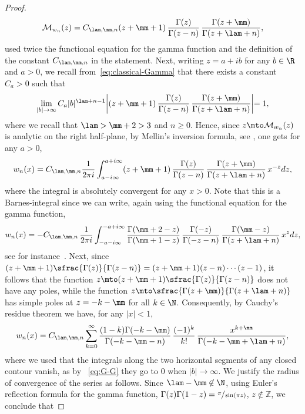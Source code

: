 \begin{proof}
\begin{equation*}
\mathcal{M}_{w_n}(z) = C_{\lam, \mm, n} (z+\mm+1)\,\frac{\Gamma(z)}{\Gamma(z-n)}\, \frac{\Gamma(z+\mm)}{\Gamma(z+\lam+n)},
\end{equation*}
used twice the functional equation for the gamma function and the definition of the constant $C_{\lam, \mm, n}$ in the statement. Next, writing $z=a+ib$ for any $b \in \R$ and $a>0$, we recall from~\eqref{eq:classical-Gamma} that there exists a constant $C_a > 0$ such that
\begin{equation}
\label{eq:G-G}
\lim_{|b| \to \infty} C_a |b|^{\lam + n-1} \biggl|(z+\mm+1)\, \frac{\Gamma(z)}{\Gamma(z-n)}\, \frac{\Gamma(z+\mm)}{\Gamma(z+\lam+n)} \biggl| = 1,
\end{equation}
where we recall that $\lam > \mm+2 >3$ and $n \geq 0$. Hence, since $z \mto \mathcal{M}_{w_n}(z)$ is analytic on the right half-plane, by Mellin's inversion formula, see \eg \cite[Chap.\,11]{Misra-Lavoine}, one gets for any $a>0$,
\begin{equation*}
w_n(x) = C_{\lam, \mm, n} \frac{1}{2 \pi i} \int_{a - i \infty}^{a + i \infty} (z+\mm+1)\,\frac{\Gamma(z)}{\Gamma(z-n)}\, \frac{\Gamma(z+\mm)}{\Gamma(z+\lam+n)}\, x^{-z} dz,
\end{equation*}
where the integral is absolutely convergent for any $x>0$. Note that this is a Barnes-integral since we can write, again using the functional equation for the gamma function,
\begin{align*}
w_n(x) = -C_{\lam, \mm, n}\,\frac{1}{2 \pi i} \int_{-a - i \infty}^{-a + i \infty} \frac{\Gamma(\mm+2-z)}{\Gamma(\mm+1-z)}\, \frac{\Gamma(-z)}{\Gamma(-z-n)}\, \frac{\Gamma(\mm-z)}{\Gamma(z+\lam+n)}\, x^{z}dz,
\end{align*}
see for instance~\cite{barnes_integrals}. Next, since $(z+\mm+1)\sfrac{\Gamma(z)}{\Gamma(z-n)} = (z+\mm+1)(z-n)\cdots(z-1)$, it follows that the function $z \mto (z+\mm+1)\sfrac{\Gamma(z)}{\Gamma(z-n)}$ does not have any poles, while the function $z \mto \sfrac{\Gamma(z+\mm)}{\Gamma(z+\lam+n)}$ has simple poles at $z = -k-\mm$ for all $k \in \N$. Consequently, by Cauchy's residue theorem we have, for any $|x|<1$,
\begin{equation*}
w_n(x) = C_{\lam, \mm, n} \sum_{k = 0}^{\infty} \frac{(1-k)\Gamma(-k-\mm)}{\Gamma(-k-\mm-n)}\, \frac{(-1)^k}{k!}\,\frac{x^{k+\mm}}{ \Gamma(-k-\mm+\lam+n)},
\end{equation*}
where we used that the integrals along the two horizontal segments of any closed contour vanish, as by ~\eqref{eq:G-G} they go to $0$ when $|b|\to \infty$. We justify the radius of convergence of the series as follows. Since $\lam - \mm \not\in \N$, using Euler's reflection formula for the gamma function, \ie $\Gamma(z)\Gamma(1-z) = \sfrac{\pi}{\sin(\pi z)}$, $z \not\in \mathbb{Z}$, we conclude that

\end{proof}

